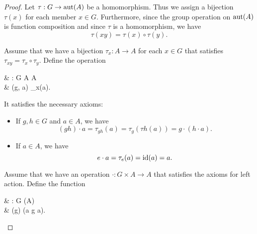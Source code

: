 \begin{proof}
   Let \( \tau: G \to \operatorname{aut}(A) \) be a homomorphism. Thus we assign a bijection \( \tau(x) \) for each member \( x \in G \). Furthermore, since the group operation on \( \operatorname{aut}(A) \) is function composition and since \( \tau \) is a homomorphism, we have
  \begin{equation*}
    \tau(xy) = \tau(x) \circ \tau(y).
  \end{equation*}

   Assume that we have a bijection \( \tau_x: A \to A \) for each \( x \in G \) that satisfies \( \tau_{xy} = \tau_x \circ \tau_y \). Define the operation
  \begin{BreakableAlign*}
     & \cdot: G \times A \to A          \\
     & \cdot(g, a) \coloneqq \tau_x(a).
  \end{BreakableAlign*}

  It satisfies the necessary axioms:
  \begin{itemize}
    \item If \( g, h \in G \) and \( a \in A \), we have
          \begin{equation*}
            (g h) \cdot a
            =
            \tau_{g h}(a)
            =
            \tau_{g}(\tau{h}(a))
            =
            g \cdot (h \cdot a).
          \end{equation*}

    \item If \( a \in A \), we have
          \begin{equation*}
            e \cdot a
            =
            \tau_e(a)
            =
            \operatorname{id}(a)
            =
            a.
          \end{equation*}
  \end{itemize}

   Assume that we have an operation \( \cdot: G \times A \to A \) that satisfies the axioms for left action. Define the function
  \begin{BreakableAlign*}
     & \tau: G \to \Aut(A)                      \\
     & \tau(g) \coloneqq (a \mapsto g \cdot a).
  \end{BreakableAlign*}


\end{proof}
